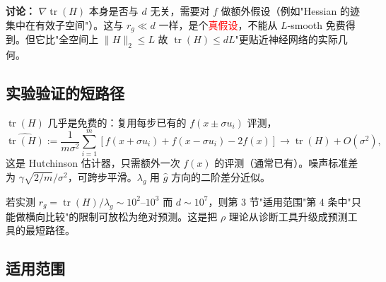 \documentclass[UTF8]{ctexart}
\begin{document}
\textbf{讨论：} $\nabla\operatorname{tr}(H)$ 本身是否与 $d$ 无关，需要对 $f$ 做额外假设（例如"Hessian 的迹集中在有效子空间"）。这与 $r_g \ll d$ 一样，是个\textcolor{red}{真假设}，不能从 $L$-smooth 免费得到。但它比"全空间上 $\|H\|_2\leq L$ 故 $\operatorname{tr}(H)\leq dL$"更贴近神经网络的实际几何。

\subsection{实验验证的短路径}

$\operatorname{tr}(H)$ 几乎是免费的：复用每步已有的 $f(x\pm\sigma u_i)$ 评测，
\[
\widehat{\operatorname{tr}(H)}
:=
\frac{1}{m\sigma^2}\sum_{i=1}^m\left[f(x+\sigma u_i) + f(x-\sigma u_i) - 2f(x)\right]
\to
\operatorname{tr}(H) + O(\sigma^2),
\]
这是 Hutchinson 估计器，只需额外一次 $f(x)$ 的评测（通常已有）。噪声标准差为 $\gamma\sqrt{2/m}/\sigma^2$，可跨步平滑。$\lambda_g$ 用 $\widehat g$ 方向的二阶差分近似。

若实测 $r_g = \operatorname{tr}(H)/\lambda_g \sim 10^2$–$10^3$ 而 $d\sim 10^7$，则第 3 节"适用范围"第 4 条中"只能做横向比较"的限制可放松为绝对预测。这是把 $\rho$ 理论从诊断工具升级成预测工具的最短路径。


\subsection{适用范围}
\end{document}
